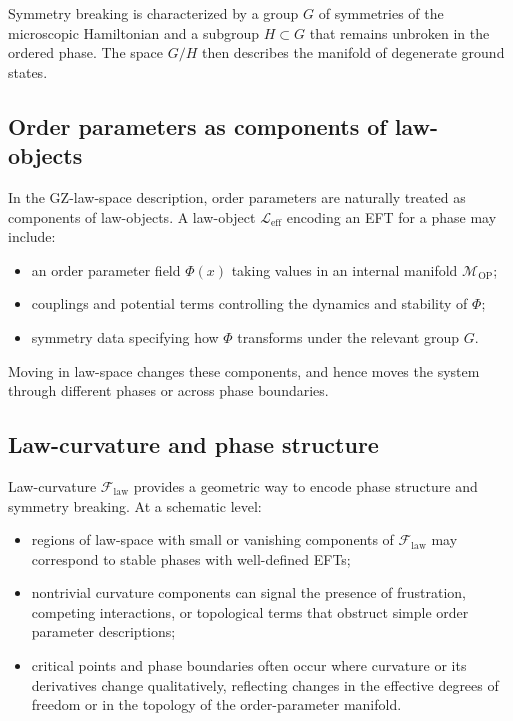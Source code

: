 \documentclass[11pt]{book}
\newcommand{\GZLCurv}{\ensuremath{\mathcal{F}_{\mathrm{law}}}}
\theoremstyle{plain}
\theoremstyle{definition}
\theoremstyle{remark}
\begin{document}
Symmetry breaking is characterized by a group $G$ of symmetries of
the microscopic Hamiltonian and a subgroup $H \subset G$ that
remains unbroken in the ordered phase. The space $G/H$ then
describes the manifold of degenerate ground states.

\subsection*{Order parameters as components of law-objects}

In the GZ-law-space description, order parameters are naturally
treated as components of law-objects. A law-object
$\mathcal{L}_{\mathrm{eff}}$ encoding an EFT for a phase may
include:
\begin{itemize}
  \item an order parameter field $\Phi(x)$ taking values in an
        internal manifold $\mathcal{M}_{\mathrm{OP}}$;
  \item couplings and potential terms controlling the dynamics and
        stability of $\Phi$;
  \item symmetry data specifying how $\Phi$ transforms under the
        relevant group $G$.
\end{itemize}

Moving in law-space changes these components, and hence moves the
system through different phases or across phase boundaries.

\subsection*{Law-curvature and phase structure}

Law-curvature $\GZLCurv$ provides a geometric way to encode phase
structure and symmetry breaking. At a schematic level:
\begin{itemize}
  \item regions of law-space with small or vanishing components of
        $\GZLCurv$ may correspond to stable phases with well-defined
        EFTs;
  \item nontrivial curvature components can signal the presence of
        frustration, competing interactions, or topological terms
        that obstruct simple order parameter descriptions;
  \item critical points and phase boundaries often occur where
        curvature or its derivatives change qualitatively, reflecting
        changes in the effective degrees of freedom or in the
        topology of the order-parameter manifold.
\end{itemize}
\end{document}
